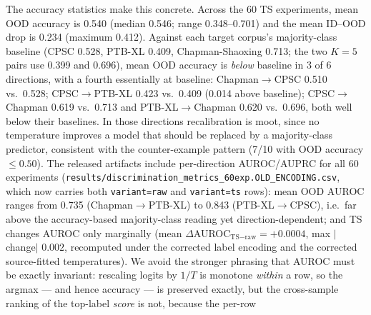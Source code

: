 \documentclass[review,12pt,nonatbib]{elsarticle}
\begin{document}
The accuracy statistics make this concrete. Across the 60 TS
experiments, mean OOD accuracy is 0.540 (median 0.546; range
0.348--0.701) and the mean ID--OOD drop is 0.234 (maximum 0.412).
Against each target corpus's majority-class baseline (CPSC 0.528,
PTB-XL 0.409, Chapman-Shaoxing 0.713; the two $K{=}5$ pairs use
0.399 and 0.696), mean OOD accuracy is
\emph{below} baseline in 3 of 6 directions, with a fourth essentially
at baseline: Chapman$\rightarrow$CPSC
0.510 vs.\ 0.528; CPSC$\rightarrow$PTB-XL 0.423 vs.\ 0.409 (0.014
above baseline); CPSC$\rightarrow$Chapman 0.619 vs.\ 0.713 and
PTB-XL$\rightarrow$Chapman 0.620 vs.\ 0.696, both well below their
baselines. In those
directions recalibration is moot, since no temperature improves a model that
should be replaced by a majority-class predictor, consistent with
the counter-example pattern (7/10 with OOD accuracy $\leq 0.50$).
The released artifacts include per-direction AUROC/AUPRC for all 60
experiments (\texttt{results/discrimination\_metrics\_60exp.OLD\_ENCODING.csv},
which now carries both \texttt{variant=raw} and \texttt{variant=ts} rows):
mean OOD
AUROC ranges from 0.735 (Chapman$\rightarrow$PTB-XL) to 0.843
(PTB-XL$\rightarrow$CPSC), i.e.\ far above the accuracy-based
majority-class reading yet direction-dependent; and TS changes AUROC only
marginally (mean $\Delta$AUROC$_{\text{TS}-\text{raw}} = +0.0004$, max
$|$change$|$ $0.002$, recomputed under the corrected label encoding and
the corrected source-fitted temperatures). We
avoid the stronger phrasing that AUROC must be exactly invariant:
rescaling logits by $1/T$ is monotone \emph{within} a row, so the argmax
--- and hence accuracy --- is preserved exactly, but the cross-sample
ranking of the top-label \emph{score} is not, because the per-row
\end{document}
